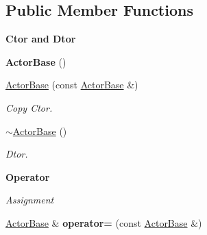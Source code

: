 \subsection*{Public Member Functions}
\begin{Indent}{\bf Ctor and Dtor}\par
{\em \label{_amgrpad04e46909a047f9938f8e1fa1abe24a}
 }\begin{DoxyCompactItemize}
\item 
\hypertarget{classContent_1_1Actor_1_1Admin_1_1ActorBase_a1d0ca22e169369d41aed03760a61bf66}{
{\bfseries ActorBase} ()}
\label{classContent_1_1Actor_1_1Admin_1_1ActorBase_a1d0ca22e169369d41aed03760a61bf66}

\item 
\hypertarget{classContent_1_1Actor_1_1Admin_1_1ActorBase_aff9d045e57063ea6ee1dfcd24716a65d}{
\hyperlink{classContent_1_1Actor_1_1Admin_1_1ActorBase_aff9d045e57063ea6ee1dfcd24716a65d}{ActorBase} (const \hyperlink{classContent_1_1Actor_1_1Admin_1_1ActorBase}{ActorBase} \&)}
\label{classContent_1_1Actor_1_1Admin_1_1ActorBase_aff9d045e57063ea6ee1dfcd24716a65d}

\begin{DoxyCompactList}\small\item\em Copy Ctor. \item\end{DoxyCompactList}\item 
\hypertarget{classContent_1_1Actor_1_1Admin_1_1ActorBase_a16f84f5402fbc0679da2718a50472c66}{
\hyperlink{classContent_1_1Actor_1_1Admin_1_1ActorBase_a16f84f5402fbc0679da2718a50472c66}{$\sim$ActorBase} ()}
\label{classContent_1_1Actor_1_1Admin_1_1ActorBase_a16f84f5402fbc0679da2718a50472c66}

\begin{DoxyCompactList}\small\item\em Dtor. \item\end{DoxyCompactList}\end{DoxyCompactItemize}
\end{Indent}
\begin{Indent}{\bf Operator}\par
{\em \label{_amgrpe1b3ec89ead7f83a9245ed5c9cacfdbf}
 Assignment }\begin{DoxyCompactItemize}
\item 
\hypertarget{classContent_1_1Actor_1_1Admin_1_1ActorBase_a1d27454046a70d7c5136ca986f7bf4f6}{
\hyperlink{classContent_1_1Actor_1_1Admin_1_1ActorBase}{ActorBase} \& {\bfseries operator=} (const \hyperlink{classContent_1_1Actor_1_1Admin_1_1ActorBase}{ActorBase} \&)}
\label{classContent_1_1Actor_1_1Admin_1_1ActorBase_a1d27454046a70d7c5136ca986f7bf4f6}

\end{DoxyCompactItemize}
\end{Indent}
